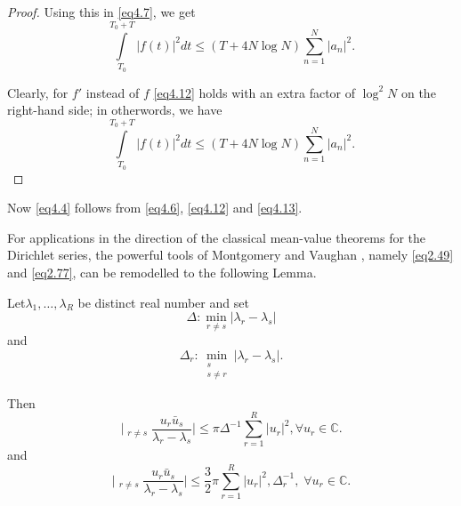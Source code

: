 \begin{proof}
Using this in \eqref{eq4.7}, we get
\begin{equation*}
\int\limits_{T_0}^{T_0+T}|f(t)|^2 dt \leq (T + 4N \log N) \sum_{n=1}^N
|a_n|^2. \tag{4.12} \label{eq4.12}
\end{equation*}
  
Clearly, for $f'$ instead of $f$ \eqref{eq4.12} holds with an extra factor
of $\log^2 N$ on the right-hand side; in otherwords, we have 
\begin{equation*}
\int\limits_{T_0}^{T_0+T}|f(t)|^2 dt \leq (T + 4N \log N) \sum_{n=1}^N
|a_n|^2. \tag{4.13}\label{eq4.13} 
\end{equation*}   
\end{proof}

Now \eqref{eq4.4} follows from \eqref{eq4.6}, \eqref{eq4.12} and
\eqref{eq4.13}. 
    
For applications in the direction of the classical mean-value theorems
for the Dirichlet series, the powerful tools of Montgomery and Vaughan
\cite{key1}, namely \eqref{eq2.49} and \eqref{eq2.77}, can be
remodelled to the following Lemma.  

\setcounter{section}{4} 
\setcounter{lemma}{0} 
\begin{lemma}\label{chap4-lem4.1} %
Let\pageoriginale $\lambda_{1}, \ldots, \lambda_R$  be distinct real
number and set 
\begin{equation*}
\Delta :\min_{r\neq s}|\lambda_r - \lambda_s | \tag{4.14}\label{eq4.14}
\end{equation*} 
and
\begin{equation*}
\Delta_r : \min _{\substack{s \\ s\neq r}}  |\lambda_r - \lambda_s
|. \tag{4.15}\label{eq4.15} 
\end{equation*} 


Then
\begin{equation*}
\bigg| \mathop{\sum_{r = 1}^{R} \sum_{s=1}^{R}}_{r\neq s}  \frac{u_r
  \bar{u}_s}{\lambda_r - \lambda_s}\bigg| \le \pi \Delta^{-1}
\sum_{r=1}^R |u_r|^2, \forall u_r \in
\mathbb{C}. \tag{4.16}\label{eq4.16} 
\end{equation*}
and
\begin{equation*}
\bigg| \mathop{\sum_{r=1}^{R} \sum_{s=1}^R}_{r\neq s}  \frac{u_r
  \bar{u}_s}{\lambda_r - \lambda_s}\bigg| \leq \frac{3}{2} \pi
\sum_{r=1}^R |u_r|^2, \Delta^{-1}_r, \; \forall u_r \in 
\mathbb{C}. \tag{4.17} \label{eq4.17} 
\end{equation*}
\end{lemma}

